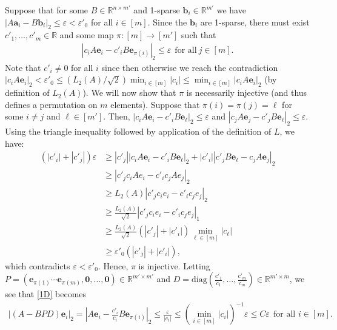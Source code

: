 \documentclass[journal, onecolumn]{IEEEtran}
\begin{document}
Suppose that for some $B \in \mathbb{R}^{n \times m'}$ and 1-sparse $\mathbf{b}_i \in \mathbb{R}^{m'}$ we have  $|A\mathbf{a}_i - B\mathbf{b}_i|_2 \leq \varepsilon < \varepsilon'_0$ for all $i \in [m]$. Since the $\mathbf{b}_i$ are 1-sparse, there must exist $c'_1, \ldots, c'_m \in \mathbb{R}$ and some map $\pi: [m] \to [m']$ such that 
\begin{align}\label{1D2}
|c_iA\mathbf{e}_i - c'_iB\mathbf{e}_{\pi(i)}|_2 \leq \varepsilon \ \ \text{for all} \  j \in [m].
\end{align} 
Note that $c'_i \neq 0$ for all $i$ since then otherwise we reach the contradiction $|c_iA\mathbf{e}_i|_2 < \varepsilon'_0 \leq (L_2(A)/\sqrt{2}) \min_{i \in [m]}|c_i| \leq \min_{i\in [m]}|c_iA\mathbf{e}_i|_2$ (by definition of $L_2(A)$). We will now show that $\pi$ is necessarily injective (and thus defines a permutation on $m$ elements). Suppose that $\pi(i) = \pi(j) = \ell$ for some $i \neq j$ and $\ell \in [m']$. Then, $|c_iA\mathbf{e}_i - c'_iB\mathbf{e}_{\ell}|_2  \leq \varepsilon$ and $|c_jA\mathbf{e}_j - c'_jB\mathbf{e}_{\ell}|_2 \leq \varepsilon$. Using the triangle inequality followed by application of the definition of $L$, we have:
\begin{align*}
(|c'_i| + |c'_j|) \varepsilon
&\geq |c'_j||c_iA\mathbf{e}_i - c'_iB\mathbf{e}_{\ell}|_2 + |c'_i||c'_jB\mathbf{e}_{\ell} - c_jA\mathbf{e}_j|_2 \\
&\geq |c'_jc_iAe_i - c'_ic_jAe_j|_2 \\
&\geq L_2(A)|c'_jc_ie_i - c'_ic_je_j|_2 \\
&\geq \frac{L_2(A)}{\sqrt{2}}|c'_jc_ie_i - c'_ic_je_j|_1 \\
&\geq \frac{L_2(A)}{\sqrt{2}} \left( |c'_j| + |c'_i| \right) \min_{\ell \in [m]} |c_\ell | \\
&\geq \varepsilon'_0 \left( |c'_j| + |c'_i| \right),
\end{align*}
%
which contradicts $\varepsilon < \varepsilon'_0$. Hence, $\pi$ is injective. Letting $P = \left( \mathbf{e}_{\pi(1)} \cdots \mathbf{e}_{\pi(m)}, \mathbf{0}, \ldots, \mathbf{0} \right) \in \mathbb{R}^{m' \times m'}$ and $D = \text{diag}(\frac{c'_1}{c_1},\ldots,\frac{c'_m}{c_m}) \in \mathbb{R}^{m' \times m}$, we see that \eqref{1D} becomes 
\begin{align}
|(A - BPD)\mathbf{e}_i|_2 = |A\mathbf{e}_i - \frac{c'_i}{c_i}B\mathbf{e}_{\pi(i)}|_2 \leq \frac{\varepsilon}{|c_i|} \leq (\min_{i \in [m]} |c_i|)^{-1} \varepsilon \leq C\varepsilon \ \ \text{for all } i \in [m].
\end{align}
\end{document}
